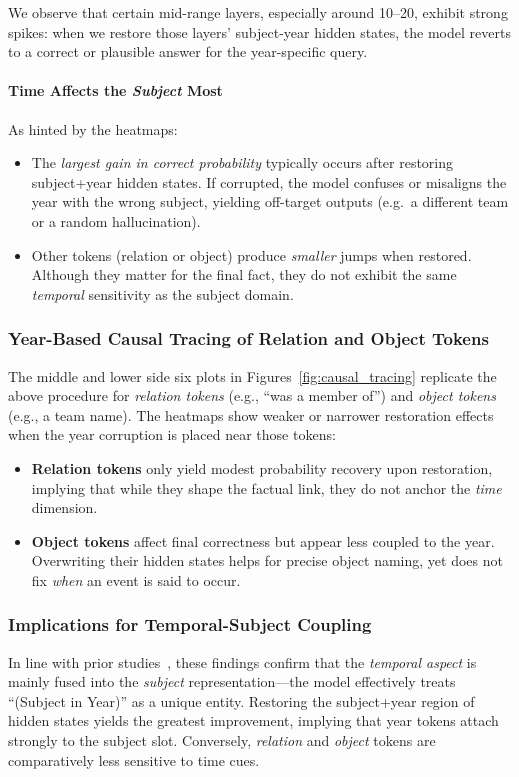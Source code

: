 We observe that certain mid-range layers, especially around 10--20, exhibit strong spikes: 
when we restore those layers’ subject-year hidden states, the model reverts to a correct or plausible answer for the year-specific query.

\paragraph{Time Affects the \emph{Subject} Most}
As hinted by the heatmaps:
\begin{itemize}
    \item The \emph{largest gain in correct probability} typically occurs after restoring subject+year hidden states. 
    If corrupted, the model confuses or misaligns the year with the wrong subject, yielding off-target outputs (e.g.\ a different team or a random hallucination).
    \item Other tokens (relation or object) produce \emph{smaller} jumps when restored. Although they matter for the final fact, they do not exhibit the same \emph{temporal} sensitivity as the subject domain.
\end{itemize}

\subsubsection{Year-Based Causal Tracing of Relation and Object Tokens}
The middle and lower side six plots in Figures~\ref{fig:causal_tracing} replicate the above procedure for \emph{relation tokens} (e.g., “was a member of”) and \emph{object tokens} (e.g., a team name). 
The heatmaps show weaker or narrower restoration effects when the year corruption is placed near those tokens:

\begin{itemize}
    \item \textbf{Relation tokens} only yield modest probability recovery upon restoration, implying that while they shape the factual link, they do not anchor the \emph{time} dimension.
    \item \textbf{Object tokens} affect final correctness but appear less coupled to the year. Overwriting their hidden states helps for precise object naming, yet does not fix \emph{when} an event is said to occur.
\end{itemize}

\subsubsection{Implications for Temporal-Subject Coupling}
In line with prior studies~\cite{rome}, these findings confirm that the \emph{temporal aspect} is mainly fused into the \emph{subject} representation---the model effectively treats “(Subject in Year)” as a unique entity. 
Restoring the subject+year region of hidden states yields the greatest improvement, implying that year tokens attach strongly to the subject slot. 
Conversely, \emph{relation} and \emph{object} tokens are comparatively less sensitive to time cues.

